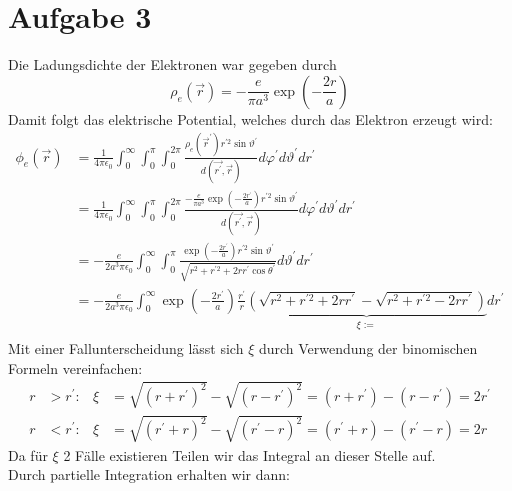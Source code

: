 \documentclass{article}
\newcommand{\epsz}{\epsilon_0}
\begin{document}
\section*{Aufgabe 3}
Die Ladungsdichte der Elektronen war gegeben durch
\[
	\rho_e(\vec r) = - \frac{e}{\pi a^3} \exp\left(-\frac{2r}{a} \right)
\]
Damit folgt das elektrische Potential, welches durch das Elektron erzeugt
wird:
\begin{align*}
	\phi_e\left( \vec r \right)
	&= \frac 1 {4\pi\epsz}
	\int_0^\infty \int_0^\pi \int_0^{2\pi}
	\frac{\rho_e(\vec r^\prime) r^{\prime 2} \sin\vartheta^\prime}
	{d \left(\vec{r^\prime}, \vec r \right) }
	d\varphi^\prime d\vartheta^\prime dr^\prime \\
	&= \frac 1 {4\pi\epsz}
	\int_0^\infty \int_0^\pi \int_0^{2\pi}
	\frac{
	- \frac{e}{\pi a^3} \exp\left(-\frac{2r^\prime}{a} \right)
	r^{\prime 2} \sin\vartheta^\prime}
	{d \left(\vec{r^\prime}, \vec r \right) }
	d\varphi^\prime d\vartheta^\prime dr^\prime \\
	&= - \frac e {2 a^3 \pi\epsz}
	\int_0^\infty \int_0^\pi
	\frac{
	 \exp\left(-\frac{2r^\prime}{a} \right)
	r^{\prime 2} \sin\vartheta^\prime}
	{\sqrt{r^2 + r^{\prime 2} + 2r r^\prime \cos\theta^\prime}}
	d\vartheta^\prime dr^\prime \\
	&= - \frac e {2 a^3 \pi\epsz}
	\int_0^\infty
	\exp\left(-\frac{2r^\prime}{a} \right)
	\frac{r^\prime}{r} \underbrace{ \left(
	\sqrt{r^2 + r^{\prime 2} + 2r r^\prime} -
	\sqrt{r^2 + r^{\prime 2} - 2r r^\prime} \right)}_{
		\xi :=}
	dr^\prime \\
\end{align*}
Mit einer Fallunterscheidung lässt sich $\xi$ durch Verwendung der
binomischen Formeln vereinfachen:
\begin{align*}
	r &> r^\prime: &
	\xi &= \sqrt{(r + r^\prime)^2} - \sqrt{(r - r^\prime)^2}
	= (r + r^\prime) - (r - r^\prime) = 2r^\prime \\
	r &< r^\prime: &
	\xi  &= \sqrt{(r^\prime + r)^2} - \sqrt{(r^\prime - r)^2}
	= (r^\prime + r) - (r^\prime - r) = 2r
\end{align*}
Da für $\xi$ 2 Fälle existieren Teilen wir das Integral an dieser Stelle
auf.\\
Durch partielle Integration erhalten wir dann:
\end{document}
